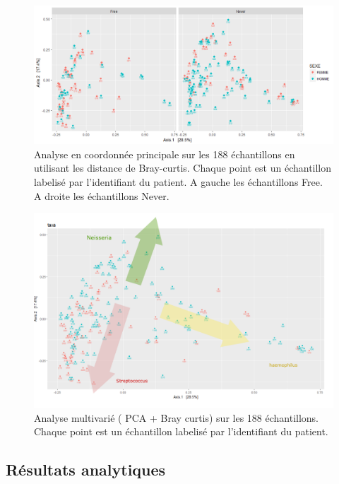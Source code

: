 \documentclass[12pt,a4paper]{article}
\begin{document}
\begin{figure}
\begin{center}
\includegraphics[scale=0.60]{img/oordination_new.png}\hfill
\end{center}
\caption{Analyse en coordonnée principale sur les 188 échantillons en utilisant les distance de Bray-curtis. Chaque point est un échantillon labelisé par l'identifiant du patient. A gauche les échantillons Free. A droite les échantillons Never. }
\label{ordination}
\end{figure}

\begin{figure}
\begin{center}
\includegraphics[scale=0.40]{img/Capture.png}\hfill
\end{center}
\caption{Analyse multivarié ( PCA + Bray curtis) sur les 188 échantillons. Chaque point est un échantillon labelisé par l'identifiant du patient.}
\label{ordination2}
\end{figure}


\subsection{Résultats analytiques}
\end{document}
